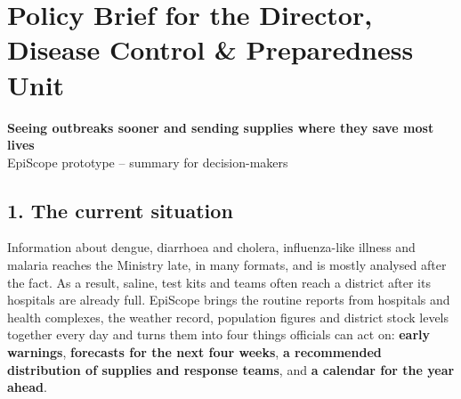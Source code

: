 \section{Policy Brief for the Director, Disease Control \& Preparedness Unit}
\begin{center}\large\textbf{Seeing outbreaks sooner and sending supplies where they save most lives}\\[2pt]
\normalsize EpiScope prototype -- summary for decision-makers\end{center}

\noindent{}

\subsection*{1. The current situation}
Information about dengue, diarrhoea and cholera, influenza-like illness and malaria reaches the Ministry late,
in many formats, and is mostly analysed after the fact. As a result, saline, test kits and teams often reach a
district after its hospitals are already full. EpiScope brings the routine reports from hospitals and health
complexes, the weather record, population figures and district stock levels together every day and turns them
into four things officials can act on: \textbf{early warnings}, \textbf{forecasts for the next four weeks},
\textbf{a recommended distribution of supplies and response teams}, and \textbf{a calendar for the year ahead}.

